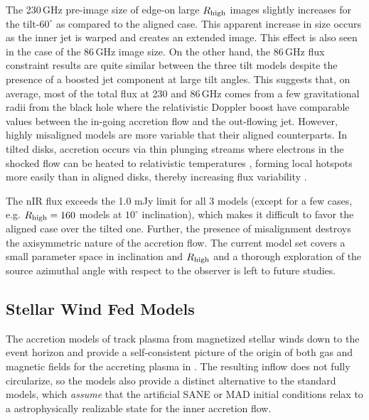 The 230\,GHz pre-image size of edge-on large $R_{\rm high}$ images slightly increases for the tilt-$60^{\circ}$ as compared to the aligned case. This apparent increase in size occurs as the inner jet is warped and creates an extended image. This effect is also seen in the case of the 86\,GHz image size. On the other hand, the 86\,GHz flux constraint results are quite similar between the three tilt models despite the presence of a boosted jet component at large tilt angles. This suggests that, on average, most of the total flux at 230 and 86\,GHz comes from a few gravitational radii from the black hole where the relativistic Doppler boost have comparable values between the in-going accretion flow and the out-flowing jet. However, highly misaligned models are more variable that their aligned counterparts. In tilted disks, accretion occurs via thin plunging streams \citep[e.g.,][]{Fragile2007} where electrons in the shocked flow can be heated to relativistic temperatures \citep[e.g.][]{Dexter2013}, forming local hotspots more easily than in aligned disks, thereby increasing flux variability \citep{Chatterjee2020}.

The nIR flux exceeds the 1.0 mJy limit for all 3 models (except for a few cases, e.g. $R_{\rm high}=160$ models at $10^{\circ}$ inclination), which makes it difficult to favor the aligned case over the tilted one. Further, the presence of misalignment destroys the axisymmetric nature of the accretion flow. The current model set covers a small parameter space in inclination and $R_{\rm high}$ and a thorough exploration of the source azimuthal angle with respect to the observer is left to future studies. 

\subsection{Stellar Wind Fed Models}

The accretion models of \cite{2020ApJ...896L...6R, 2020MNRAS.492.3272R, 2018MNRAS.478.3544R} track plasma from  magnetized stellar winds down to the event horizon and provide a self-consistent picture of the origin of both gas and magnetic fields for the accreting plasma in \sgra.  The resulting inflow does not fully circularize, so the models also provide a distinct alternative to the standard models, which {\em assume} that the artificial SANE or MAD initial conditions relax to a astrophysically realizable state for the inner accretion flow.

